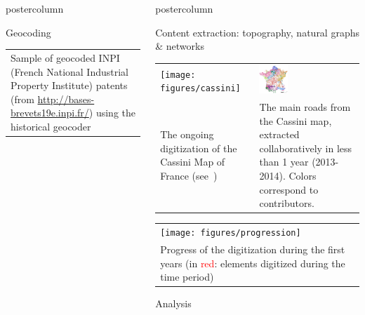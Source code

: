 \documentclass[final,hyperref={pdfpagelabels=false}]{beamer}
\let\oldcite=\cite
\renewcommand{\cite}[1]{\textcolor{ta3chameleon}{\oldcite{#1}}}
\begin{document}
\begin{frame}
\begin{columns}
\begin{column}{0.5\textwidth}
\begin{beamercolorbox}[center,wd=\textwidth]{postercolumn}
\begin{minipage}[t]{.98\textwidth}
\begin{block}{Geocoding}
\begin{tabular}{>{\centering}m{}}
          \scriptsize Sample of geocoded INPI (French National Industrial Property Institute) patents (from \url{http://bases-brevets19e.inpi.fr/}) using the historical geocoder~\cite{Cura2018}
        \end{tabular}
      \end{block}
    \end{minipage}
    \end{beamercolorbox}
    \end{column}
    \begin{column}{0.5\textwidth}
    \begin{beamercolorbox}[center,wd=\textwidth]{postercolumn}
    \begin{minipage}[t]{.98\textwidth}
      \begin{block}{Content extraction: topography, natural graphs \& networks}
        \begin{tabular}{p{}p{}}
          \vspace{0pt}
	  \texttt{[image: figures/cassini]}&
          \vspace{0pt}
          {\hspace*{3cm}
            \includegraphics[width=0.3\textwidth]{figures/contrib}
          }
          \\
          \scriptsize The ongoing digitization of the Cassini Map of France (see~\cite{Perret2015_,Perret2015Data_})&
          \scriptsize The main roads from the Cassini map, extracted collaboratively in less than 1 year (2013-2014). Colors correspond to contributors.\\
        \end{tabular}
        \begin{tabular}{>{\centering}p{}}
          \texttt{[image: figures/progression]}\\
          \scriptsize Progress of the digitization during the first years (in \textcolor{red}{red}: elements digitized during the time period)
        \end{tabular}
      \end{block}
      \begin{block}{Analysis}
      

\end{block}
\end{minipage}
\end{beamercolorbox}
\end{column}
\end{columns}
\end{frame}
\end{document}
